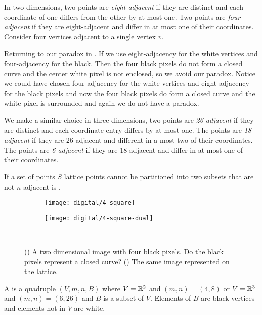 In two dimensions, two points are \emph{eight-adjacent}
if they are distinct and each coordinate of one differs from
the other by at most one.
Two points are \emph{four-adjacent} if
they are eight-adjacent and differ in at most one of their coordinates.
Consider four vertices adjacent to a single vertex $v$.

Returning to our paradox in .
If we use eight-adjacency
for the white vertices and four-adjacency for the black.
Then the four black pixels do not form a closed curve 
and the center white pixel is not enclosed, so we avoid our paradox. 
Notice we could have chosen four adjacency
for the white vertices and eight-adjacency for the black pixels and 
now the four black pixels do form a closed curve and the white pixel
is surrounded and again we do not have a paradox.



We make a similar choice in three-dimensions, two points
are \emph{26-adjacent} if they are distinct and each coordinate 
entry differs by at most one.
The points are \emph{18-adjacent} if they are 26-adjacent
and different in  a most two of their coordinates.
The points are \emph{6-adjacent} if they are 18-adjacent and differ 
in at most one of their coordinates.

If a set of points $S$ lattice points cannot be
partitioned into two subsets that are not
$n$-adjacent is .



\begin{figure}[htb]
        \centering
        \begin{subfigure}[b]{0.25\textwidth}
        \texttt{[image: digital/4-square]}
        \caption{}
          \label{fig:4-square}
        \end{subfigure}
          \hspace{.3cm}
         \begin{subfigure}[b]{0.25\textwidth}
        \texttt{[image: digital/4-square-dual]}
        \caption{}
        \label{fig:4-square-dual}
        \end{subfigure}\\
		\caption{() A two dimensional image with four black pixels.
		Do the black pixels represent a closed curve? () The same image
		represented on the lattice.
		\label{fig:4-square-and-dual}}
\end{figure}

A  is a quadruple $(V,m,n,B)$ where
$V=\mathbb{R}^2$ and $(m,n)=(4,8)$ or $V=\mathbb{R}^3$ and $(m,n)=(6,26)$
and $B$ is a subset of $V$. Elements of $B$ are black vertices
and elements not in $V$ are white.


